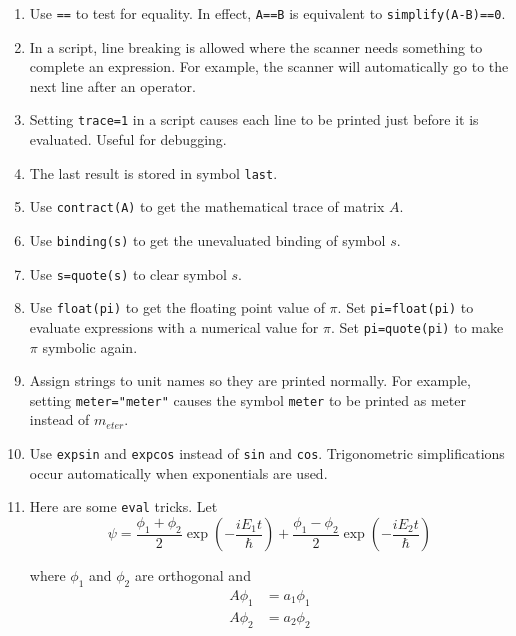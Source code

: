 \documentclass[12pt]{article}
\begin{document}
\begin{enumerate}

\item
Use \verb$==$ to test for equality.
In effect, \verb$A==B$ is equivalent to \verb$simplify(A-B)==0$.

\item
In a script, line breaking is allowed where the scanner needs something to complete an expression.
For example, the scanner will automatically go to the next line after an operator.

\item
Setting \verb$trace=1$ in a script causes each line to be printed just before it is evaluated.
Useful for debugging.

\item
The last result is stored in symbol \verb$last$.

\item
Use \verb$contract(A)$ to get the mathematical trace of matrix $A$.

\item
Use \verb$binding(s)$ to get the unevaluated binding of symbol $s$.

\item
Use \verb$s=quote(s)$ to clear symbol $s$.

\item
Use \verb$float(pi)$ to get the floating point value of $\pi$.
Set \verb$pi=float(pi)$ to evaluate expressions with a numerical value for $\pi$.
Set \verb$pi=quote(pi)$ to make $\pi$ symbolic again.

\item
Assign strings to unit names so they are printed normally.
For example, setting \verb$meter="meter"$ causes the symbol \verb$meter$
to be printed as meter instead of $m_{eter}$.

\item
Use \verb$expsin$ and \verb$expcos$ instead of \verb$sin$ and \verb$cos$.
Trigonometric simplifications occur automatically when exponentials are used.

\item
Here are some \verb$eval$ tricks. Let
\begin{equation*}
\psi
=\frac{\phi_1+\phi_2}{2}\exp\left(-\frac{iE_1t}{\hbar}\right)
+\frac{\phi_1-\phi_2}{2}\exp\left(-\frac{iE_2t}{\hbar}\right)
\end{equation*}

where $\phi_1$ and $\phi_2$ are orthogonal and
\begin{align*}
A\phi_1&=a_1\phi_1
\\
A\phi_2&=a_2\phi_2
\end{align*}


\end{enumerate}
\end{document}
